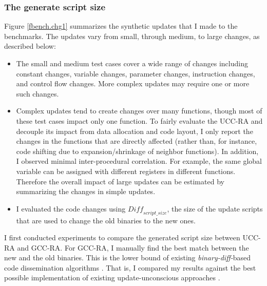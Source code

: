 \subsubsection{The generate script size}
Figure \ref{fbench.chg1} summarizes the synthetic updates that I made to the
benchmarks. The updates vary from small, through medium, to large changes,
as described below:
\begin{itemize}
\itemsep 0pt
\item
The small and medium test cases cover a wide range of changes
including constant changes, variable changes, parameter changes,
instruction changes, and control flow changes. More complex updates
may require one or more such changes.

\item 
Complex updates tend to create changes over many functions, though
most of these test cases impact only one function.  To fairly evaluate
the UCC-RA and decouple its impact from data allocation and code
layout, I only report the changes in the functions that are directly
affected (rather than, for instance, code shifting due to
expansion/shrinkage of neighbor functions).  In addition, I observed
minimal inter-procedural correlation. For example, the same global
variable can be assigned with different registers in different
functions.  Therefore the overall impact of large updates can be
estimated by summarizing the changes in simple updates.

\item
I evaluated the code changes using $\textit{Diff}_{script\_size}$, the
size of the update scripts that are used to change the old binaries to the
new ones. 

\end{itemize}


I first conducted experiments to compare the generated script size
between UCC-RA and GCC-RA.  For GCC-RA, I manually find the best
match between the new and the old binaries. This is the lower bound of
existing {\em binary-diff-}based code dissemination algorithms
\cite{flink,related:script}. That is, I compared my results against the best possible
implementation of existing update-unconscious approaches
\cite{flink,related:script}. 


